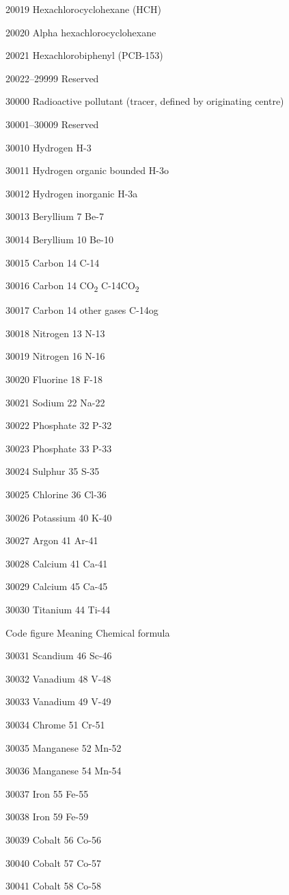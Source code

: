 20019 Hexachlorocyclohexane (HCH)

20020 Alpha hexachlorocyclohexane

20021 Hexachlorobiphenyl (PCB-153)

20022--29999 Reserved

30000 Radioactive pollutant (tracer, defined by originating centre)

30001--30009 Reserved

30010 Hydrogen H-3

30011 Hydrogen organic bounded H-3o

30012 Hydrogen inorganic H-3a

30013 Beryllium 7 Be-7

30014 Beryllium 10 Be-10

30015 Carbon 14 C-14

30016 Carbon 14 CO\textsubscript{2} C-14CO\textsubscript{2}

30017 Carbon 14 other gases C-14og

30018 Nitrogen 13 N-13

30019 Nitrogen 16 N-16

30020 Fluorine 18 F-18

30021 Sodium 22 Na-22

30022 Phosphate 32 P-32

30023 Phosphate 33 P-33

30024 Sulphur 35 S-35

30025 Chlorine 36 Cl-36

30026 Potassium 40 K-40

30027 Argon 41 Ar-41

30028 Calcium 41 Ca-41

30029 Calcium 45 Ca-45

30030 Titanium 44 Ti-44

Code figure Meaning Chemical formula

30031 Scandium 46 Sc-46

30032 Vanadium 48 V-48

30033 Vanadium 49 V-49

30034 Chrome 51 Cr-51

30035 Manganese 52 Mn-52

30036 Manganese 54 Mn-54

30037 Iron 55 Fe-55

30038 Iron 59 Fe-59

30039 Cobalt 56 Co-56

30040 Cobalt 57 Co-57

30041 Cobalt 58 Co-58

